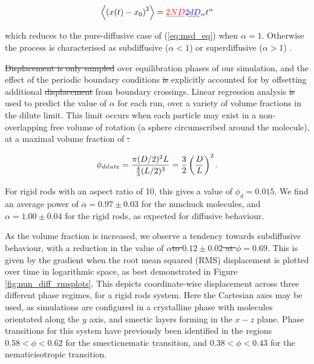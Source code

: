 \documentclass[11pt, a4paper]{article} %
\providecommand{\DIFadd}[1]{{\protect\color{blue}\uwave{#1}}} %
\providecommand{\DIFdel}[1]{{\protect\color{red}\sout{#1}}}                      %
\providecommand{\DIFaddbegin}{} %
\providecommand{\DIFaddend}{} %
\providecommand{\DIFdelbegin}{} %
\providecommand{\DIFdelend}{} %
\begin{document}
\begin{equation}
\left\langle \left(x(t) - x_{0}\right)^{2} \right\rangle = \DIFdelbegin \DIFdel{2ND}\DIFdelend \DIFaddbegin \DIFadd{2dD}\DIFaddend _{\alpha}t^{\alpha}
\end{equation}

which reduces to the pure-diffusive case of (\ref{eq:msd_eq}) when $\alpha=1$. Otherwise the process is characterised as subdiffusive ($\alpha < 1$) or superdiffusive ($\alpha > 1$) \cite{Metzler2000}. 

\DIFdelbegin \DIFdel{Displacement is only sampled }\DIFdelend \DIFaddbegin \DIFadd{\textcolor{forestgreen}{Displacements were only sampled} }\DIFaddend over equilibration phases of our simulation, and the effect of the periodic boundary conditions \DIFdelbegin \DIFdel{is }\DIFdelend \DIFaddbegin \DIFadd{were }\DIFaddend explicitly accounted for by offsetting additional \DIFdelbegin \DIFdel{displacement }\DIFdelend \DIFaddbegin \DIFadd{displacements }\DIFaddend from boundary crossings. Linear regression analysis \DIFdelbegin \DIFdel{is }\DIFdelend \DIFaddbegin \DIFadd{was }\DIFaddend used to predict the value of $\alpha$ for each run, over a variety of volume fractions in the dilute limit. This limit occurs when each particle may exist in a non-overlapping free volume of rotation (a sphere circumscribed around the molecule), at a maximal volume fraction of
\DIFdelbegin \DIFdel{:
}\DIFdelend 

\begin{equation}
\phi_{dilute} = \frac{\pi(D/2)^{2}L}{\frac{4}{3}(L/2)^{3}} = \frac{3}{2} \left( \frac{D}{L}\right)^{2}\DIFaddbegin \DIFadd{. 
}\DIFaddend \end{equation}

For rigid rods with an aspect ratio of 10, this gives a value of $\phi_{d} = 0.015$. We find an average power of $ \alpha = 0.97 \pm 0.03 $ for the nunchuck molecules, and $ \alpha = 1.00 \pm 0.04 $ for the rigid rods, as expected for diffusive behaviour. 

As the volume fraction is increased, we observe a tendency towards subdiffusive behaviour, with a reduction in the value of $\alpha$\DIFdelbegin \DIFdel{to $0.12 \pm 0.02 $ at $\phi = 0.69$}\DIFdelend . This is given by the gradient when the root mean squared (RMS) displacement is plotted over time in logarithmic space, as best demonstrated in Figure \ref{fig:nun_diff_rmsplots}. This depicts coordinate-wise displacement across three different phase regimes, for a rigid rods system. Here the Cartesian axes may be used, as simulations are configured in a crystalline phase with molecules orientated along the $y$ axis, and smectic layers forming in the $x-z$ plane. Phase transitions for this system have previously been identified in the regions $0.58<\phi<0.62$ for the smectic\textendash nematic transition, and $0.38<\phi<0.43$ for the nematic\textendash isotropic transition. 
\end{document}
